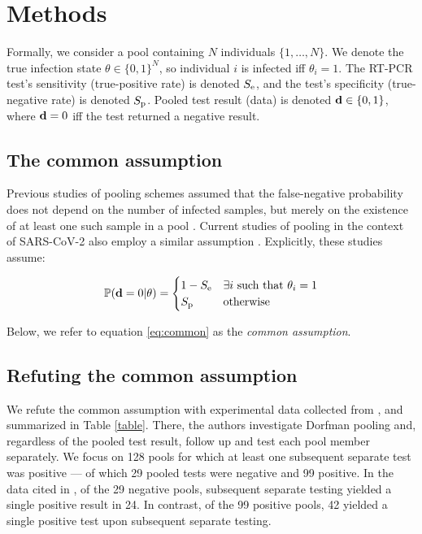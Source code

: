 \documentclass{article}
\begin{document}
\section*{Methods}
Formally, we consider a pool containing $N$ individuals
$\{1,\dots,N\}$. We denote the true infection state $\theta \in
\{0,1\}^N$, so individual $i$ is infected iff $\theta_i=1$. The RT-PCR
test's sensitivity (true-positive rate) is denoted $S_{\text{e}}$, and the
test's specificity (true-negative rate) is denoted $S_{\text{p}}$. Pooled
test result (data) is denoted $\mathbf{d} \in \{0,1\}$, where $\mathbf{d}=0$ iff
the test returned a negative result.

\subsection*{The common assumption}\label{subsec:common}
Previous studies of pooling schemes assumed that the false-negative
probability does not depend on the number of infected samples, but
merely on the existence of at least one such sample in a pool
\cite{Kim, OptimalDorfmanPool}. Current studies of pooling in the
context of SARS-CoV-2 also employ a similar assumption
\cite{Simplistic1, Simplistic2}. Explicitly, these studies assume:

\begin{align}\label{eq:common}
  \mathbb{P}(\mathbf{d}=0|\theta) = 
  \begin{cases} 
    1-S_{\text{e}} & \exists i\ \text{such that } \theta_i = 1\\
    S_{\text{p}} & \text{otherwise}
  \end{cases} 
\end{align}

Below, we refer to equation \eqref{eq:common} as the \emph{common
  assumption}. 

\subsection*{Refuting the common assumption}\label{subsec:refute}
We refute the common assumption with experimental data collected from
\cite{Salazar}, and summarized in Table \ref{table}. There, the
authors investigate Dorfman pooling and, regardless of the pooled test
result, follow up and test each pool member separately. We focus on
128 pools for which at least one subsequent separate test was positive
--- of which 29 pooled tests were negative and 99 positive. In the
data cited in \cite{Salazar}, of the 29 negative pools, subsequent
separate testing yielded a single positive result in 24. In contrast,
of the 99 positive pools, 42 yielded a single positive test upon
subsequent separate testing.
\end{document}

